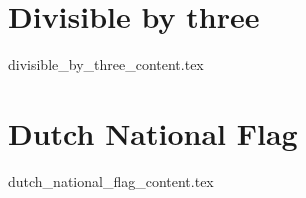 \documentclass[justified, openany]{tufte-book}
\theoremstyle{plain}%
\theoremstyle{definition}
\theoremstyle{remark}
\begin{document}
\clearpage
\chapter{Divisible by three}
{divisible_by_three_content.tex}

\clearpage
\chapter{Dutch National Flag}
{dutch_national_flag_content.tex}

\begin{fullwidth}


\end{fullwidth}

\printindex

\listoftodos
\end{document}
